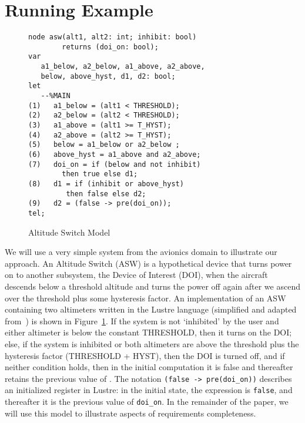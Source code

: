 \section{Running Example}
\label{sec:example}


\begin{figure}[t]
\centering
{\smaller
\begin{verbatim}
node asw(alt1, alt2: int; inhibit: bool)
        returns (doi_on: bool);
var
   a1_below, a2_below, a1_above, a2_above,
   below, above_hyst, d1, d2: bool;
let
   --%MAIN
(1)   a1_below = (alt1 < THRESHOLD);
(2)   a2_below = (alt2 < THRESHOLD);
(3)   a1_above = (alt1 >= T_HYST);
(4)   a2_above = (alt2 >= T_HYST);
(5)   below = a1_below or a2_below ;
(6)   above_hyst = a1_above and a2_above;
(7)   doi_on = if (below and not inhibit)
        then true else d1;
(8)   d1 = if (inhibit or above_hyst) 
         then false else d2;
(9)   d2 = (false -> pre(doi_on));
tel;
\end{verbatim}
}
\vspace{-0.1in}
\caption{Altitude Switch Model}
\label{fig:asw}
\end{figure}

We will use a very simple system from the avionics domain to illustrate our approach. An Altitude Switch (ASW) is a hypothetical device that turns power on to another subsystem, the Device of Interest (DOI), when the aircraft descends below a threshold altitude and turns the power off again after we ascend over the threshold plus some hysteresis factor.  An implementation of an ASW containing two altimeters written in the Lustre language (simplified and adapted from~\cite{HCW02:ase-deviation}) is shown in Figure~\ref{fig:asw}.  If the system is not `inhibited' by the user and either altimeter is below the constant THRESHOLD, then it turns on the DOI; else, if the system is inhibited or both altimeters are above the threshold plus the hysteresis factor (THRESHOLD + HYST), then the DOI is turned off, and if neither condition holds, then in the initial computation it is false and thereafter retains the previous value of .  The notation \texttt{(false -> pre(doi\_on))} describes an initialized register in Lustre: in the initial state, the expression is \texttt{false}, and thereafter it is the previous value of \texttt{doi\_on}.  In the remainder of the paper, we will use this model to illustrate aspects of requirements completeness.  %


